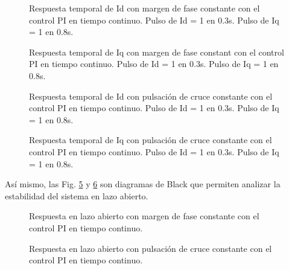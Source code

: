 \documentclass{report}
\begin{document}
\begin{figure}[!h]
    \centering
    \caption{Respuesta temporal de Id con margen de fase constante con el control PI en tiempo continuo. Pulso de Id = 1 en 0.3s. Pulso de Iq = 1 en 0.8s.}
    \label{fig.respuestatemporalfaseconstd}
\end{figure} 

\begin{figure}[!h]
    \centering
    \caption{Respuesta temporal de Iq con margen de fase constant con el control PI en tiempo continuo. Pulso de Id = 1 en 0.3s. Pulso de Iq = 1 en 0.8s.}
    \label{fig.respuestatemporalfaseconstq}
\end{figure} 


\begin{figure}[!h]
    \centering
    \caption{Respuesta temporal de Id con pulsación de cruce constante con el control PI en tiempo continuo. Pulso de Id = 1 en 0.3s. Pulso de Iq = 1 en 0.8s.}
    \label{fig.respuestatemporalpulsacionconstd}
\end{figure} 

\begin{figure}[!h]
    \centering
    \caption{Respuesta temporal de Iq con pulsación de cruce constante con el control PI en tiempo continuo. Pulso de Id = 1 en 0.3s. Pulso de Iq = 1 en 0.8s.}
    \label{fig.respuestatemporalpulsacionconstq}
\end{figure} 

Así mismo, las Fig. \ref{fig.respuestablackfaseconstG} y \ref{fig.respuestablackpulsacionconstG} son diagramas de Black que permiten analizar la estabilidad del sistema en lazo abierto.

\begin{figure}[!h]
    \centering
    \caption{Respuesta en lazo abierto con margen de fase constante con el control PI en tiempo continuo.}
    \label{fig.respuestablackfaseconstG}
\end{figure} 

\begin{figure}[!h]
    \centering
    \caption{Respuesta en lazo abierto con pulsación de cruce constante con el control PI en tiempo continuo.}
    \label{fig.respuestablackpulsacionconstG}
\end{figure} 
\end{document}
